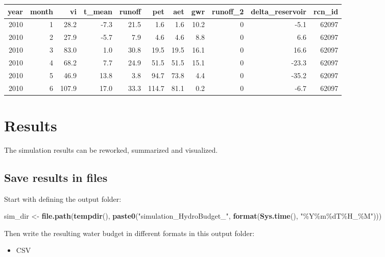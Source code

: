 \documentclass[
]{book}
\newenvironment{Shaded}{\begin{snugshade}}{\end{snugshade}}
\newcommand{\FunctionTok}[1]{\textcolor[rgb]{0.13,0.29,0.53}{\textbf{#1}}}
\newcommand{\NormalTok}[1]{#1}
\newcommand{\OtherTok}[1]{\textcolor[rgb]{0.56,0.35,0.01}{#1}}
\newcommand{\StringTok}[1]{\textcolor[rgb]{0.31,0.60,0.02}{#1}}
\providecommand{\tightlist}{%
  \setlength{\itemsep}{0pt}\setlength{\parskip}{0pt}}
\begin{document}
\begin{tabular}{r|r|r|r|r|r|r|r|r|r|r}
\hline
year & month & vi & t\_mean & runoff & pet & aet & gwr & runoff\_2 & delta\_reservoir & rcn\_id\\
\hline
2010 & 1 & 28.2 & -7.3 & 21.5 & 1.6 & 1.6 & 10.2 & 0 & -5.1 & 62097\\
\hline
2010 & 2 & 27.9 & -5.7 & 7.9 & 4.6 & 4.6 & 8.8 & 0 & 6.6 & 62097\\
\hline
2010 & 3 & 83.0 & 1.0 & 30.8 & 19.5 & 19.5 & 16.1 & 0 & 16.6 & 62097\\
\hline
2010 & 4 & 68.2 & 7.7 & 24.9 & 51.5 & 51.5 & 15.1 & 0 & -23.3 & 62097\\
\hline
2010 & 5 & 46.9 & 13.8 & 3.8 & 94.7 & 73.8 & 4.4 & 0 & -35.2 & 62097\\
\hline
2010 & 6 & 107.9 & 17.0 & 33.3 & 114.7 & 81.1 & 0.2 & 0 & -6.7 & 62097\\
\hline
\end{tabular}

\hypertarget{results}{%
\section{Results}\label{results}}

The simulation results can be reworked, summarized and visualized.

\hypertarget{save-results-in-files}{%
\subsection{Save results in files}\label{save-results-in-files}}

Start with defining the output folder:

\begin{Shaded}
\begin{Highlighting}[]
\NormalTok{sim\_dir }\OtherTok{\textless{}{-}} \FunctionTok{file.path}\NormalTok{(}\FunctionTok{tempdir}\NormalTok{(), }\FunctionTok{paste0}\NormalTok{(}\StringTok{"simulation\_HydroBudget\_"}\NormalTok{, }\FunctionTok{format}\NormalTok{(}\FunctionTok{Sys.time}\NormalTok{(), }\StringTok{"\%Y\%m\%dT\%H\_\%M"}\NormalTok{)))}
\end{Highlighting}
\end{Shaded}

Then write the resulting water budget in different formats in this output folder:

\begin{itemize}
\tightlist
\item
  CSV
\end{itemize}
\end{document}
